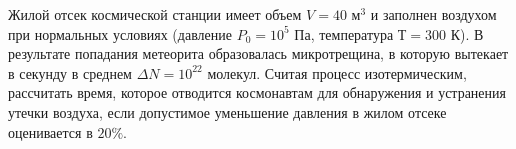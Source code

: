 
Жилой отсек космической станции имеет объем $V=40$ м$^3$ и заполнен воздухом при нормальных условиях (давление $P_0=10^5$ Па, температура $Т=300$ К). 
В результате попадания метеорита образовалась микротрещина, в которую вытекает в секунду в среднем $\Delta N=10^{22}$ молекул. Считая процесс изотермическим, 
рассчитать время, которое отводится космонавтам для обнаружения и устранения утечки воздуха, если допустимое уменьшение давления в жилом отсеке оценивается в $20\%$. 